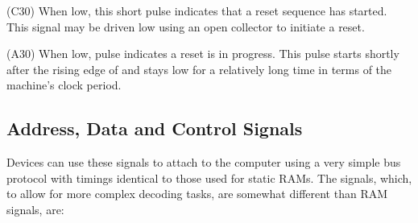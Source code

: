 \begin{description}
  \item{\bfseries\RESET} (C30) When low, this short pulse indicates that a
    reset sequence has started. This signal may be driven low using an
    open collector to initiate a reset.
  \item{\bfseries\RSTHOLD} (A30) When low, pulse indicates a reset is in
    progress. This pulse starts shortly after the rising edge of
    \RESET{} and stays low for a relatively long time in terms of the
    machine's clock period.
\end{description}

\subsection{Address, Data and Control Signals}

Devices can use these signals to attach to the computer using a very simple bus protocol with timings identical to those used for static RAMs. The signals, which, to allow for more complex decoding tasks, are somewhat different than RAM signals, are:

